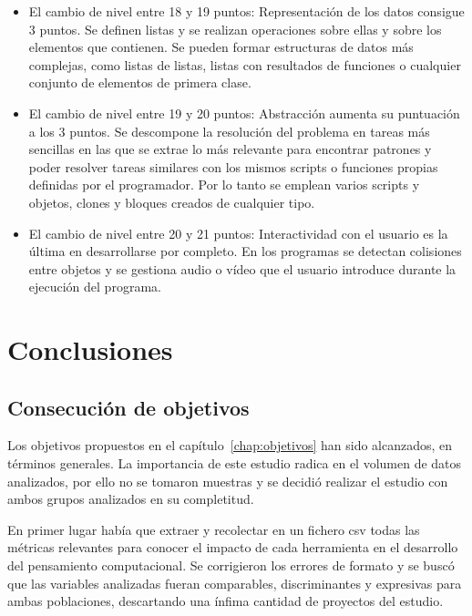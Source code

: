 \documentclass[a4paper, 12pt]{book}
\begin{document}
\begin{itemize}
 \item El cambio de nivel entre 18 y 19 puntos: Representación de los datos consigue 3 puntos. Se definen listas y se realizan operaciones sobre ellas y sobre los elementos que contienen. Se pueden formar estructuras de datos más complejas, como listas de listas, listas con resultados de funciones o cualquier conjunto de elementos de primera clase.
 \item El cambio de nivel entre 19 y 20 puntos: Abstracción aumenta su puntuación a los 3 puntos. Se descompone la resolución del problema en tareas más sencillas en las que se extrae lo más relevante para encontrar patrones y poder resolver tareas similares con los mismos scripts o funciones propias definidas por el programador. Por lo tanto se emplean varios scripts y objetos, clones y bloques creados de cualquier tipo.
 \item El cambio de nivel entre 20 y 21 puntos: Interactividad con el usuario es la última en desarrollarse por completo. En los programas se detectan colisiones entre objetos y se gestiona audio o vídeo que el usuario introduce durante la ejecución del programa.
\end{itemize} 
 


\cleardoublepage
\chapter{Conclusiones}
\label{chap:conclusiones}

\section{Consecución de objetivos}
\label{sec:consecucion-objetivos}

Los objetivos propuestos en el capítulo~\ref{chap:objetivos} han sido alcanzados, en términos generales. La importancia de este estudio radica en el volumen de datos analizados, por ello no se tomaron muestras y se decidió realizar el estudio con ambos grupos analizados en su completitud.

En primer lugar había que extraer y recolectar en un fichero csv todas las métricas relevantes para conocer el impacto de cada herramienta en el desarrollo del pensamiento computacional. Se corrigieron los errores de formato y se buscó que las variables analizadas fueran comparables,  discriminantes y expresivas para ambas poblaciones, descartando una ínfima cantidad de proyectos del estudio.
\end{document}
